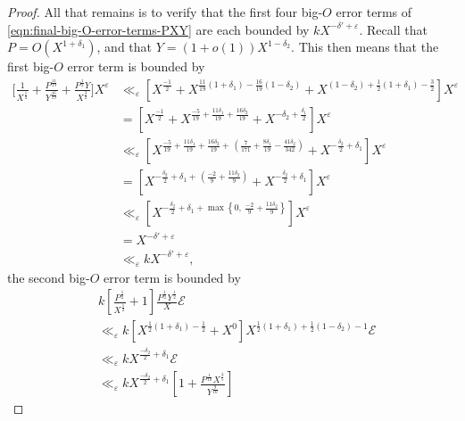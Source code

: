 \documentclass[12pt,letterpaper,reqno]{amsart}
\theoremstyle{plain}
\theoremstyle{definition}
\numberwithin{equation}{section}
\numberwithin{figure}{section}
\numberwithin{table}{section}
\newcommand{\lrp}[1]{\!\left(#1\right)}
\newcommand{\lrb}[1]{\!\left[#1\right]}
\newcommand{\lrcb}[1]{\!\left\{#1\right\}}
\newcommand{\EE}{\mathcal{E}}
\begin{document}
\begin{proof}
All that remains is to verify that the first four big-$O$ error terms of \eqref{eqn:final-big-O-error-terms-PXY} are each bounded by $k X^{-\delta'+\varepsilon}$. Recall that $P=O(X^{1+\delta_1})$, and that $Y=(1+o(1))X^{1-\delta_2}$. This then means that the first big-$O$ error term is bounded by
\begin{align}
    \bigg[\frac{1}{X^\frac{1}{2}} + \frac{P^{\frac{11}{19}}}{Y^{\frac{16}{19}}} + \frac{P^\frac{1}{2}Y}{X^{\frac{3}{2}}}\bigg]X^\varepsilon
    &\ll_\varepsilon 
    \lrb{
        X^\frac{-1}{2} + X^{\frac{11}{19} (1+\delta_1) - \frac{16}{19}(1-\delta_2) } + 
        X^{(1-\delta_2) + \frac{1}{2}(1+\delta_1) - \frac{3}{2}}
    }X^\varepsilon \\
    &=
    \lrb{
        X^\frac{-1}{2} + X^{
            \frac{-5}{19} + \frac{11 \delta_1}{19}  + \frac{16\delta_2}{19} 
        } + 
        X^{-\delta_2 + \frac{\delta_1}{2}}
    }X^\varepsilon \\
    &\ll_\varepsilon 
    \lrb{
        X^{
            \frac{-5}{19} + \frac{11 \delta_1}{19}  + \frac{16\delta_2}{19} 
            +
            \,\lrp{
                \frac{7}{171} + \frac{8 \delta_1}{19} - \frac{41\delta_2}{342}
            }
        } + 
        X^{-\frac{\delta_2}{2} + \delta_1}
    }X^\varepsilon \\
    &=
    \lrb{
        X^{-\frac{\delta_2}{2} +\delta_1 + \,\lrp{\frac{-2}{9} + \frac{11\delta_2}{9}}} + 
        X^{-\frac{\delta_2}{2} +\delta_1 }
    }X^\varepsilon \\
    &\ll_\varepsilon 
    \lrb{
        X^{-\frac{\delta_2}{2} +\delta_1 + \max\lrcb{0,\ \frac{-2}{9} + \frac{11\delta_2}{9}}} 
    }X^\varepsilon \\
    &= X^{-\delta'+\varepsilon} \\
    &\ll_\varepsilon  k X^{-\delta'+\varepsilon},
\end{align}
the second big-$O$ error term is bounded by
\begin{align}
    &k
    \lrb{
        \frac{P^\frac{1}{2}}{X^\frac{1}{2}}
        + 1
    }
    \frac{P^\frac{1}{2} Y^\frac{1}{2}}{X}
    \EE
    \\
    &\ll_\varepsilon  k \lrb{X^{\frac{1}{2}(1+\delta_1) - \frac{1}{2}} + X^0} X^{\frac{1}{2}(1+\delta_1) + \frac{1}{2}(1-\delta_2) - 1} \EE \\
    &\ll_\varepsilon  k X^{\frac{-\delta_2}{2}  + \delta_1} \EE\\
    &\ll_\varepsilon 
    k X^{\frac{-\delta_2}{2}  + \delta_1}
    \lrb{
        1 
        + 
        \frac{P^\frac{1}{10} X^\frac{3}{5}}{Y^\frac{9}{10}}
}
\end{align}
\end{proof}
\end{document}
